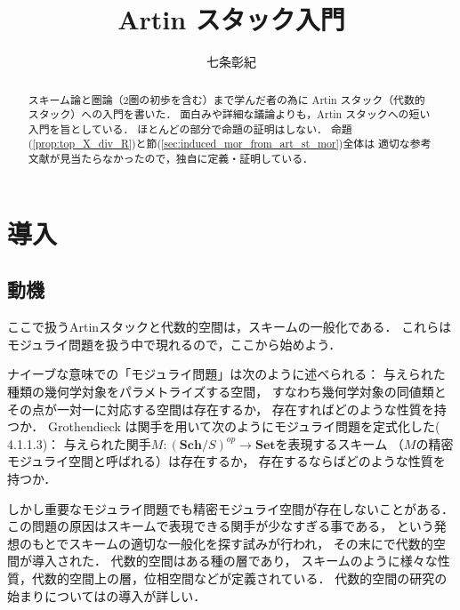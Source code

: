 



    \title{Artin スタック入門}
    \author{七条彰紀}
    \maketitle

    \begin{abstract}
        スキーム論と圏論（$2$圏の初歩を含む）まで学んだ者の為に
        Artin スタック（代数的スタック）への入門を書いた．
        面白みや詳細な議論よりも，Artin スタックへの短い入門を旨としている．
        ほとんどの部分で命題の証明はしない．
        命題 (\ref{prop:top_X_div_R})と節(\ref{sec:induced_mor_from_art_st_mor})全体は
        適切な参考文献が見当たらなかったので，独自に定義・証明している．
    \end{abstract}

    \setcounter{tocdepth}{2}
    \tableofcontents
    \newpage

\section{導入}
\subsection{動機}
    ここで扱うArtinスタックと代数的空間は，スキームの一般化である．
    これらはモジュライ問題を扱う中で現れるので，ここから始めよう．

    ナイーブな意味での「モジュライ問題」は次のように述べられる：
    与えられた種類の幾何学対象をパラメトライズする空間，
    すなわち幾何学対象の同値類とその点が一対一に対応する空間は存在するか，
    存在すればどのような性質を持つか．
    Grothendieck は関手を用いて次のようにモジュライ問題を定式化した(\cite{Kromer07} 4.1.1.3)：
    与えられた関手$M \colon (\mathbf{Sch}/S)^{op} \to \mathbf{Set}$を表現するスキーム
    （$M$の精密モジュライ空間と呼ばれる）は存在するか，
    存在するならばどのような性質を持つか．

    しかし重要なモジュライ問題でも精密モジュライ空間が存在しないことがある．
    この問題の原因はスキームで表現できる関手が少なすぎる事である，
    という発想のもとでスキームの適切な一般化を探す試みが行われ，
    その末に\cite{Artin69}で代数的空間が導入された．
    代数的空間はある種の層であり，
    スキームのように様々な性質，代数的空間上の層，位相空間などが定義されている．
    代数的空間の研究の始まりについては\cite{Knutson71}の導入が詳しい．

